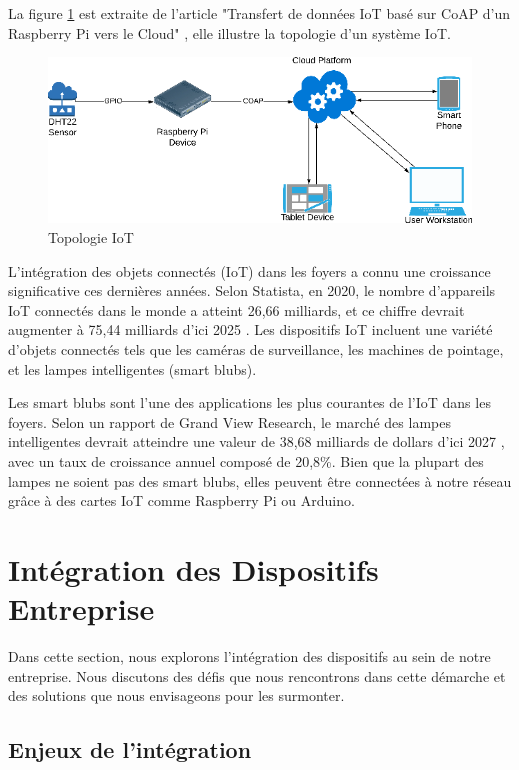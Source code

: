La figure \ref{Chap4.2.1} est extraite de l'article "Transfert de données IoT basé sur CoAP d'un Raspberry Pi vers le Cloud" \cite{Scott2019CoAPBI}, elle illustre la topologie d'un système IoT.

\begin{figure}[H]
\centering
\includegraphics[width=15cm]{Images/IoT-Topo2.png}
\caption{Topologie IoT}
\label{Chap4.2.1}
\end{figure}


L'intégration des objets connectés (IoT) dans les foyers a connu une croissance significative ces dernières années. Selon Statista, en 2020, le nombre d'appareils IoT connectés dans le monde a atteint 26,66 milliards, et ce chiffre devrait augmenter à 75,44 milliards d'ici 2025 \cite{statista-iot-2025}. Les dispositifs IoT incluent une variété d'objets connectés tels que les caméras de surveillance, les machines de pointage, et les lampes intelligentes (smart blubs). 

Les smart blubs sont l'une des applications les plus courantes de l'IoT dans les foyers. Selon un rapport de Grand View Research, le marché des lampes intelligentes devrait atteindre une valeur de 38,68 milliards de dollars d'ici 2027 \cite{market-splash-automation}, avec un taux de croissance annuel composé de 20,8\%. Bien que la plupart des lampes ne soient pas des smart blubs, elles peuvent être connectées à notre réseau grâce à des cartes IoT comme Raspberry Pi ou Arduino.


\section{Intégration des Dispositifs Entreprise}

Dans cette section, nous explorons l'intégration des dispositifs au sein de notre entreprise. Nous discutons des défis que nous rencontrons dans cette démarche et des solutions que nous envisageons pour les surmonter.

\subsection{Enjeux de l'intégration}

